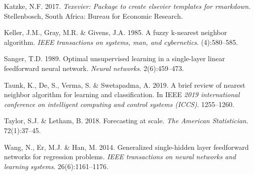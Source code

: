 \documentclass[11pt,preprint, authoryear]{elsarticle}
\numberwithin{equation}{section}
\numberwithin{figure}{section}
\numberwithin{table}{section}
\newlength{\cslhangindent}
\newenvironment{CSLReferences}%
  {\setlength{\parindent}{0pt}%
  \everypar{\setlength{\hangindent}{\cslhangindent}}\ignorespaces}%
  {\par}
\begin{document}
\hypertarget{refs}{}
\begin{CSLReferences}{1}{0}
\leavevmode{}%
Katzke, N.F. 2017. \emph{{Texevier}: {P}ackage to create elsevier
templates for rmarkdown}. Stellenbosch, South Africa: Bureau for
Economic Research.

\leavevmode{}%
Keller, J.M., Gray, M.R. \& Givens, J.A. 1985. A fuzzy k-nearest
neighbor algorithm. \emph{IEEE transactions on systems, man, and
cybernetics}. (4):580--585.

\leavevmode{}%
Sanger, T.D. 1989. Optimal unsupervised learning in a single-layer
linear feedforward neural network. \emph{Neural networks}.
2(6):459--473.

\leavevmode{}%
Taunk, K., De, S., Verma, S. \& Swetapadma, A. 2019. A brief review of
nearest neighbor algorithm for learning and classification. In IEEE
\emph{2019 international conference on intelligent computing and control
systems (ICCS)}. 1255--1260.

\leavevmode{}%
Taylor, S.J. \& Letham, B. 2018. Forecasting at scale. \emph{The
American Statistician}. 72(1):37--45.

\leavevmode{}%
Wang, N., Er, M.J. \& Han, M. 2014. Generalized single-hidden layer
feedforward networks for regression problems. \emph{IEEE transactions on
neural networks and learning systems}. 26(6):1161--1176.

\end{CSLReferences}


\end{document}
